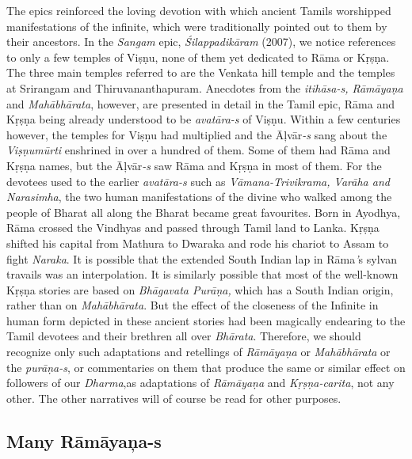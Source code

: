 The epics reinforced the loving devotion with which ancient Tamils worshipped manifestations of the infinite, which were traditionally pointed out to them by their ancestors. In the \textit{Sangam} epic, \textit{Śilappadikāram} (2007), we notice references to only a few temples of Viṣṇu, none of them yet dedicated to Rāma or Kṛṣṇa. The three main temples referred to are the Venkata hill temple and the temples at Srirangam and Thiruvananthapuram. Anecdotes from the \textit{itihāsa-s, Rāmāyaṇa} and \textit{Mahābhārata}, however, are presented in detail in the Tamil epic, Rāma and Kṛṣṇa being already understood to be \textit{avatāra-s} of Viṣṇu. Within a few centuries however, the temples for Viṣṇu had multiplied and the Āļvār\textit{-s} sang about the \textit{Viṣṇumūrti} enshrined in over a hundred of them. Some of them had Rāma and Kṛṣṇa names, but the Āļvār\textit{-s} saw Rāma and Kṛṣṇa in most of them. For the devotees used to the earlier \textit{avatāra-s} such as \textit{Vāmana-Trivikrama, Varāha and Narasimha}, the two human manifestations of the divine who walked among the people of Bharat all along the Bharat became great favourites. Born in Ayodhya, Rāma crossed the Vindhyas and passed through Tamil land to Lanka. Kṛṣṇa shifted his capital from Mathura to Dwaraka and rode his chariot to Assam to fight \textit{Naraka}. It is possible that the extended South Indian lap in Rāma\textit{’}s sylvan travails was an interpolation. It is similarly possible that most of the well-known Kṛṣṇa stories are based on \textit{Bhāgavata Purāṇa,} which has a South Indian origin, rather than on \textit{Mahābhārata}. But the effect of the closeness of the Infinite in human form depicted in these ancient stories had been magically endearing to the Tamil devotees and their brethren all over \textit{Bhārata}. Therefore, we should recognize only such adaptations and retellings of \textit{Rāmāyaṇa} or \textit{Mahābhārata} or the \textit{purāṇa-s}, or commentaries on them that produce the same or similar effect on followers of our \textit{Dharma},as adaptations of \textit{Rāmāyaṇa} and \textit{Kṛṣṇa-carita}, not any other. The other narratives will of course be read for other purposes.


\subsection{Many Rāmāyaņa-s}

